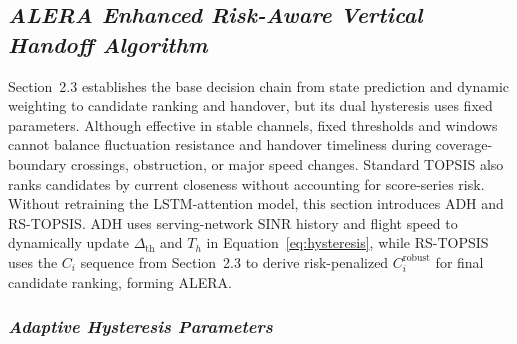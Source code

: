 \documentclass[10pt,a4paper]{article}
\begin{document}
\subsection{\textmd{\textit{ALERA Enhanced Risk-Aware Vertical Handoff Algorithm}}}

Section~2.3 establishes the base decision chain from state prediction and dynamic weighting to candidate ranking and handover, but its dual hysteresis uses fixed parameters. Although effective in stable channels, fixed thresholds and windows cannot balance fluctuation resistance and handover timeliness during coverage-boundary crossings, obstruction, or major speed changes. Standard TOPSIS also ranks candidates by current closeness without accounting for score-series risk. Without retraining the LSTM-attention model, this section introduces ADH and RS-TOPSIS. ADH uses serving-network SINR history and flight speed to dynamically update $\Delta_{\mathrm{th}}$ and $T_h$ in Equation~\eqref{eq:hysteresis}, while RS-TOPSIS uses the $C_i$ sequence from Section~2.3 to derive risk-penalized $C_i^{\mathrm{robust}}$ for final candidate ranking, forming ALERA.

\subsubsection{\textmd{\textit{Adaptive Hysteresis Parameters}}}
\end{document}
